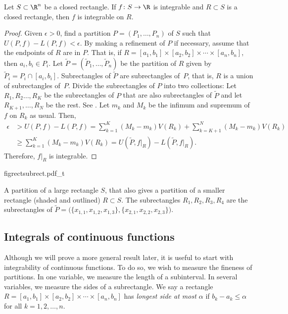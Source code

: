 \begin{prop} \label{mv:prop:integralsmallerset}
Let $S \subset \R^n$ be a closed rectangle.
If $f \colon S \to \R$ is integrable and $R \subset S$
is a closed rectangle, then $f$ is integrable on $R$.
\end{prop}

\begin{proof}
Given $\epsilon > 0$, find a partition $P=(P_1,\ldots,P_n)$
of $S$ such that
$U(P,f)-L(P,f) < \epsilon$.  By making a refinement of $P$
if necessary,
assume that the endpoints of $R$ are in $P$.  That is,
if $R = [a_1,b_1] \times [a_2,b_2] \times \cdots \times [a_n,b_n]$,
then $a_i,b_i \in P_i$.
Let $\widetilde{P} = (\widetilde{P}_1,\ldots,\widetilde{P}_n)$
be the partition of $R$ given by $\widetilde{P}_i = P_i \cap [a_i,b_i]$.
Subrectangles of $\widetilde{P}$ are subrectangles of~$P$, that
is, $R$ is a union of subrectangles of~$P$.
Divide the subrectangles of $P$ into two collections:
Let $R_1,R_2\ldots,R_K$ be the subrectangles of $P$ that are
also subrectangles of $\widetilde{P}$ and
let $R_{K+1},\ldots, R_N$ be the rest.
See .
Let $m_k$ and $M_k$ be the infimum and supremum
of $f$ on $R_k$ as usual.  Then,
\begin{equation*}
\begin{split}
\epsilon & > 
U(P,f)-L(P,f)
=
\sum_{k=1}^K (M_k-m_k) V(R_k)
+
\sum_{k=K+1}^N (M_k-m_k) V(R_k)
\\
&
\geq
\sum_{k=1}^K (M_k-m_k) V(R_k)
=
U(\widetilde{P},f|_R)-L(\widetilde{P},f|_R) .
\end{split}
\end{equation*}
Therefore, $f|_R$ is integrable.
\end{proof}
\begin{myfigureht}
{figrectsubrect.pdf_t}
\caption{A partition of a large rectangle $S$, that also gives a partition
of a smaller rectangle (shaded and outlined) $R \subset S$.
The subrectangles $R_1,R_2,R_3,R_4$ are the subrectangles of
$\widetilde{P} = \bigl( \{ x_{1,1}, x_{1,2} , x_{1,3} \} ,
\{ x_{2,1}, x_{2,2} , x_{2,3} \} \bigr)$.\label{fig:figrectsubrect}}
\end{myfigureht}

\subsection{Integrals of continuous functions}

Although we will prove a more general result later, it is useful to start
with integrability of continuous functions.
To do so, we wish to measure the fineness of partitions.
In one variable, we measure the length of a subinterval.
In several variables, we measure the sides of a subrectangle.
We say a rectangle $R = [a_1,b_1] \times
[a_2,b_2] \times \cdots \times
[a_n,b_n]$ has \emph{longest side at most $\alpha$} if
$b_k-a_k \leq \alpha$ for all $k=1,2,\ldots,n$.

